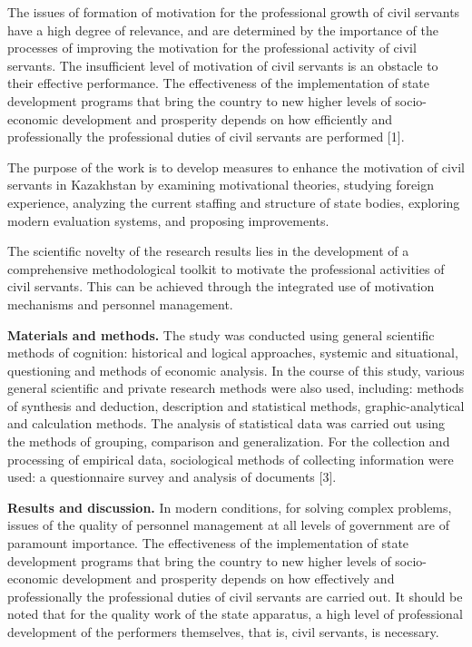 \begin{multicols}{2}
The issues of formation of motivation for the professional growth of
civil servants have a high degree of relevance, and are determined by
the importance of the processes of improving the motivation for the
professional activity of civil servants. The insufficient level of
motivation of civil servants is an obstacle to their effective
performance. The effectiveness of the implementation of state
development programs that bring the country to new higher levels of
socio-economic development and prosperity depends on how efficiently and
professionally the professional duties of civil servants are performed
{[}1{]}.

The purpose of the work is to develop measures to enhance the motivation
of civil servants in Kazakhstan by examining motivational theories,
studying foreign experience, analyzing the current staffing and
structure of state bodies, exploring modern evaluation systems, and
proposing improvements.

The scientific novelty of the research results lies in the development
of a comprehensive methodological toolkit to motivate the professional
activities of civil servants. This can be achieved through the
integrated use of motivation mechanisms and personnel management.

{\bfseries Materials and methods.} The study was conducted using general
scientific methods of cognition: historical and logical approaches,
systemic and situational, questioning and methods of economic analysis.
In the course of this study, various general scientific and private
research methods were also used, including: methods of synthesis and
deduction, description and statistical methods, graphic-analytical and
calculation methods. The analysis of statistical data was carried out
using the methods of grouping, comparison and generalization. For the
collection and processing of empirical data, sociological methods of
collecting information were used: a questionnaire survey and analysis of
documents {[}3{]}.

{\bfseries Results and discussion.} In modern conditions, for solving
complex problems, issues of the quality of personnel management at all
levels of government are of paramount importance. The effectiveness of
the implementation of state development programs that bring the country
to new higher levels of socio-economic development and prosperity
depends on how effectively and professionally the professional duties of
civil servants are carried out. It should be noted that for the quality
work of the state apparatus, a high level of professional development of
the performers themselves, that is, civil servants, is necessary.


\end{multicols}
